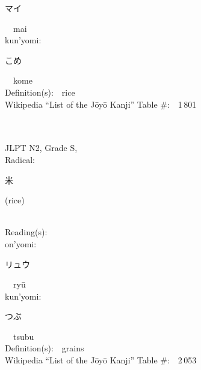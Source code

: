 \begin{multicols}{2}
{\hspace*{2em}}{\begin{CJK}{UTF8}{min} マイ \end{CJK}}\ \ mai\ \ \\
{\hspace*{1em}}kun'yomi:\ \ \\
{\hspace*{2em}}{\begin{CJK}{UTF8}{min} こめ \end{CJK}}\ \ kome\ \ \\
Definition(s):\ \ rice \\
Wikipedia ``List of the J\=oy\=o Kanji'' Table \#:\ \ 1\,801 \\
\ \ \\
{\fontsize{34pt}{40pt}  }\ \ \\  %
{JLPT N2, Grade S, \\Radical:\ \ {\begin{CJK}{UTF8}{min} 米 \end{CJK}} (rice) } \\
Reading(s):\ \ \\
{\hspace*{1em}}on'yomi:\ \ \\
{\hspace*{2em}}{\begin{CJK}{UTF8}{min} リュウ \end{CJK}}\ \ ry\=u\ \ \\
{\hspace*{1em}}kun'yomi:\ \ \\
{\hspace*{2em}}{\begin{CJK}{UTF8}{min} つぶ \end{CJK}}\ \ tsubu\ \ \\
Definition(s):\ \ grains \\
Wikipedia ``List of the J\=oy\=o Kanji'' Table \#:\ \ 2\,053 \\
\ \ \\
\end{multicols}



